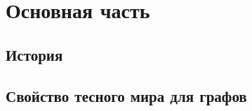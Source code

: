 \newpage
\section{Основная часть}

\subsection{История}
\newpage

\subsection{Свойство тесного мира для графов}
\newpage

\subsection{}